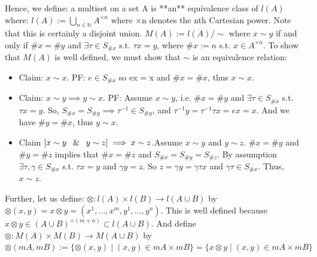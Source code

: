 \documentclass{article}
\theoremstyle{definition}
\begin{document}
Hence, we define: a multiset on a set A is **an** equivalence class of $l(A)$ where:
$l(A):= \bigcup_{n\in\mathbb{N}}A^{×n}$ where ×n denotes the nth Cartesian power. Note that this is certainly a disjoint union.
$M(A) := l(A)/\sim$ where $x\sim y$ if and only if $\#x=\#y $ and $\exists \tau \in S_{\#x}$ s.t. $\tau x=y$, where $\#x:=n $ s.t. $ x\in A^{×n}$. 
To show that $M(A)$ is well defined, we must show that $\sim$ is an equivalence relation:
\begin{itemize}
\item Claim: $x\sim x$. PF: $ e \in S_{\#x}$ so ex = x and $\#x=\#x$, thus $ x\sim x$.
\item Claim: $ x\sim y \implies y\sim x$. PF: Assume $x\sim y$, i.e. $\#x = \#y$ and $ \exists \tau \in S_{\#x} $ s.t. $\tau x = y$. So, $S_{\#x}=S_{\#y} \implies \tau^{-1} \in S_{\#y}$, and $\tau^{-1}y = \tau^{-1}\tau x = ex = x$. And we have $ \#y=\#x$, thus $y\sim x$.
\item Claim $ [x\sim y \:\And\:  y \sim z] \implies x \sim z $.Assume $x\sim y$ and $y\sim z$. $\#x=\#y$ and $\#y=\#z$ implies that $\#x=\#z$ and $S_{\#x}=S_{\#y}=S_{\#z}$. By assumption $\exists \tau, \gamma \in S_{\#x}$ s.t. $\tau x=y$ and $\gamma y=z$. So $z = \gamma y = \gamma \tau x $ and $\gamma\tau \in S_{\#x}$. Thus, $x\sim z$.
\end{itemize}

Further, let us define:
$\otimes:l(A)\times l(B)\rightarrow l(A\cup B)$ by $\otimes(x,y) = x\otimes y = (x^1,\dots,x^m,y^1,\dots,y^n)$. This is well defined because $x\otimes y \in (A\cup B)^{\times(m+n)} \subset l(A\cup B)$.
And define $\otimes:M(A)\times M(B)\rightarrow M(A\cup B)$  by $\otimes(mA,mB):=\{\otimes(x,y) \mid (x,y)\in mA\times mB\} = \{x \otimes y \mid (x,y)\in mA\times mB\}$
\end{document}
